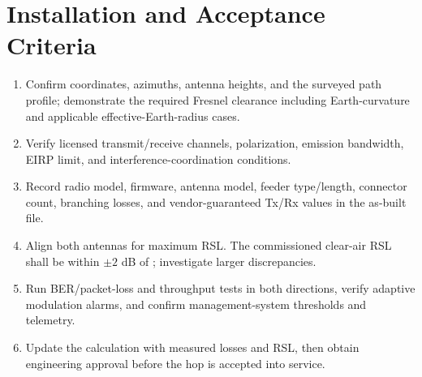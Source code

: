 \section{Installation and Acceptance Criteria}

\begin{enumerate}[leftmargin=6mm,label=\textcolor{blue}{\textbf{\arabic*.}},itemsep=2pt]
  \item Confirm coordinates, azimuths, antenna heights, and the surveyed path
        profile; demonstrate the required Fresnel clearance including Earth-curvature
        and applicable effective-Earth-radius cases.
  \item Verify licensed transmit/receive channels, polarization, emission bandwidth,
        EIRP limit, and interference-coordination conditions.
  \item Record radio model, firmware, antenna model, feeder type/length, connector
        count, branching losses, and vendor-guaranteed Tx/Rx values in the as-built file.
  \item Align both antennas for maximum RSL.  The commissioned clear-air RSL shall be
        within $\pm2$ dB of \dBm{\ReceivedPower}; investigate larger discrepancies.
  \item Run BER/packet-loss and throughput tests in both directions, verify adaptive
        modulation alarms, and confirm management-system thresholds and telemetry.
  \item Update the calculation with measured losses and RSL, then obtain engineering
        approval before the hop is accepted into service.
\end{enumerate}
